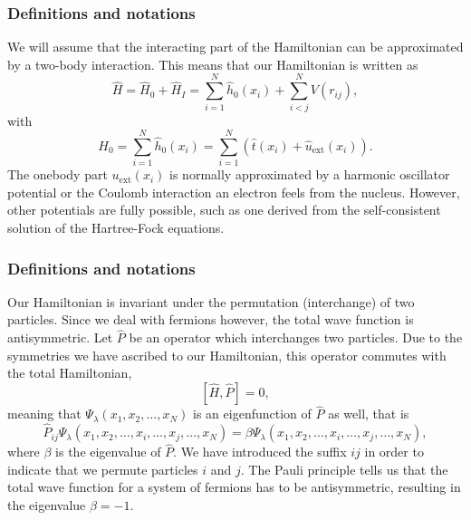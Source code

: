 \documentclass{beamer}
\begin{document}
\begin{frame}
\frametitle{Definitions and notations}

\begin{block}{}
We will assume that the interacting part of the Hamiltonian
can be approximated by a two-body interaction.
This means that our Hamiltonian is written as 
\begin{equation}
    \hat{H} = \hat{H}_0 + \hat{H}_I 
    = \sum_{i=1}^N \hat{h}_0(x_i) + \sum_{i < j}^N V(r_{ij}),
\label{Hnuclei}
\end{equation}
with 
\begin{equation}
  H_0=\sum_{i=1}^N \hat{h}_0(x_i) =  \sum_{i=1}^N\left(\hat{t}(x_i) + \hat{u}_{\mathrm{ext}}(x_i)\right).
\label{hinuclei}
\end{equation}
The onebody part $u_{\mathrm{ext}}(x_i)$ is normally approximated by a harmonic oscillator potential or the Coulomb interaction an electron feels from the nucleus. However, other potentials are fully possible, such as 
one derived from the self-consistent solution of the Hartree-Fock equations.
\end{block}
\end{frame}

\begin{frame}
\frametitle{Definitions and notations}

\begin{block}{}
Our Hamiltonian is invariant under the permutation (interchange) of two particles. %
Since we deal with fermions however, the total wave function is antisymmetric.
Let $\hat{P}$ be an operator which interchanges two particles.
Due to the symmetries we have ascribed to our Hamiltonian, this operator commutes with the total Hamiltonian,
\[
[\hat{H},\hat{P}] = 0,
 \]
meaning that $\Psi_{\lambda}(x_1, x_2, \dots , x_N)$ is an eigenfunction of 
$\hat{P}$ as well, that is
\[
\hat{P}_{ij}\Psi_{\lambda}(x_1, x_2, \dots,x_i,\dots,x_j,\dots,x_N)=
\beta\Psi_{\lambda}(x_1, x_2, \dots,x_i,\dots,x_j,\dots,x_N),
\]
where $\beta$ is the eigenvalue of $\hat{P}$. We have introduced the suffix $ij$ in order to indicate that we permute particles $i$ and $j$.
The Pauli principle tells us that the total wave function for a system of fermions
has to be antisymmetric, resulting in the eigenvalue $\beta = -1$.   
\end{block}
\end{frame}
\end{document}
